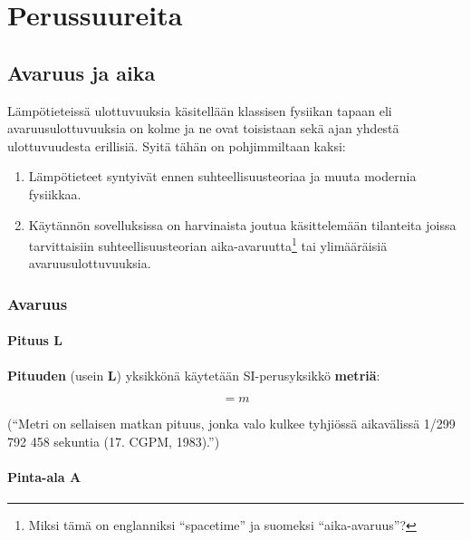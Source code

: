 \documentclass[12pt,a4paper,finnish]{book}
\begin{document}

\chapter{Perussuureita} %

\section{Avaruus ja aika} %

Lämpötieteissä ulottuvuuksia käsitellään klassisen fysiikan tapaan eli avaruusulottuvuuksia on kolme ja ne ovat 
toisistaan sekä ajan yhdestä ulottuvuudesta erillisiä. Syitä tähän on pohjimmiltaan kaksi:

\begin{enumerate}
 \item Lämpötieteet syntyivät ennen suhteellisuusteoriaa ja muuta modernia fysiikkaa.
 \item Käytännön sovelluksissa on harvinaista joutua käsittelemään tilanteita joissa tarvittaisiin 
 suhteellisuusteorian aika-avaruutta\footnote{Miksi tämä on englanniksi ``spacetime'' ja suomeksi ``aika-avaruus''?}
 tai ylimääräisiä avaruusulottuvuuksia.
\end{enumerate}

\subsection{Avaruus}

\subsubsection{Pituus L}

\textbf{Pituuden} (usein \textbf{L}) yksikkönä käytetään SI-perusyksikkö \textbf{metriä}:

\begin{equation}
 [L] = m
\end{equation}

(``Metri on sellaisen matkan pituus, jonka valo kulkee tyhjiössä aikavälissä 1/299 792 458 sekuntia 
(17. CGPM, 1983).'')

\subsubsection{Pinta-ala A}
\end{document}
